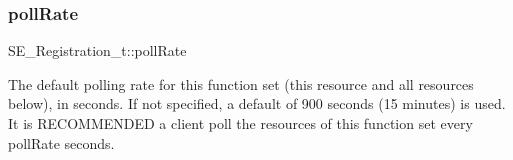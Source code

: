 \subsubsection{\texorpdfstring{poll\+Rate}{pollRate}}
{\footnotesize\ttfamily S\+E\+\_\+\+Registration\+\_\+t\+::poll\+Rate}

The default polling rate for this function set (this resource and all resources below), in seconds. If not specified, a default of 900 seconds (15 minutes) is used. It is R\+E\+C\+O\+M\+M\+E\+N\+D\+ED a client poll the resources of this function set every poll\+Rate seconds. 